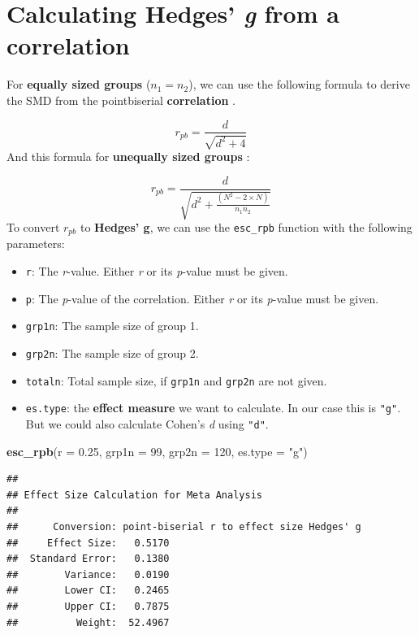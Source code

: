 \documentclass[]{book}
\newenvironment{Shaded}{\begin{snugshade}}{\end{snugshade}}
\newcommand{\DataTypeTok}[1]{\textcolor[rgb]{0.13,0.29,0.53}{#1}}
\newcommand{\DecValTok}[1]{\textcolor[rgb]{0.00,0.00,0.81}{#1}}
\newcommand{\FloatTok}[1]{\textcolor[rgb]{0.00,0.00,0.81}{#1}}
\newcommand{\KeywordTok}[1]{\textcolor[rgb]{0.13,0.29,0.53}{\textbf{#1}}}
\newcommand{\NormalTok}[1]{#1}
\newcommand{\StringTok}[1]{\textcolor[rgb]{0.31,0.60,0.02}{#1}}
\providecommand{\tightlist}{%
  \setlength{\itemsep}{0pt}\setlength{\parskip}{0pt}}
\begin{document}
\hypertarget{f}{%
\section{\texorpdfstring{Calculating Hedges' \emph{g} from a correlation}{Calculating Hedges' g from a correlation}}\label{f}}

For \textbf{equally sized groups} (\(n_1=n_2\)), we can use the following formula to derive the SMD from the pointbiserial \textbf{correlation} \citep{rosenthal1984meta}.

\[r_{pb} = \frac{d}{\sqrt{d^2+4}}\]
And this formula for \textbf{unequally sized groups} \citep{aaron1998equating}:

\[r_{pb} = \frac{d}{\sqrt{d^2+  \frac{(N^2-2 \times N)}{n_1 n_2} }}\]
To convert \(r_{pb}\) to \textbf{Hedges' g}, we can use the \texttt{esc\_rpb} function with the following parameters:

\begin{itemize}
\tightlist
\item
  \texttt{r}: The \emph{r}-value. Either \emph{r} or its \emph{p}-value must be given.
\item
  \texttt{p}: The \emph{p}-value of the correlation. Either \emph{r} or its \emph{p}-value must be given.
\item
  \texttt{grp1n}: The sample size of group 1.
\item
  \texttt{grp2n}: The sample size of group 2.
\item
  \texttt{totaln}: Total sample size, if \texttt{grp1n} and \texttt{grp2n} are not given.
\item
  \texttt{es.type}: the \textbf{effect measure} we want to calculate. In our case this is \texttt{"g"}. But we could also calculate Cohen's \emph{d} using \texttt{"d"}.
\end{itemize}

\begin{Shaded}
\begin{Highlighting}[]
\KeywordTok{esc_rpb}\NormalTok{(}\DataTypeTok{r =} \FloatTok{0.25}\NormalTok{, }\DataTypeTok{grp1n =} \DecValTok{99}\NormalTok{, }\DataTypeTok{grp2n =} \DecValTok{120}\NormalTok{, }\DataTypeTok{es.type =} \StringTok{"g"}\NormalTok{)}
\end{Highlighting}
\end{Shaded}

\begin{verbatim}
## 
## Effect Size Calculation for Meta Analysis
## 
##      Conversion: point-biserial r to effect size Hedges' g
##     Effect Size:   0.5170
##  Standard Error:   0.1380
##        Variance:   0.0190
##        Lower CI:   0.2465
##        Upper CI:   0.7875
##          Weight:  52.4967
\end{verbatim}
\end{document}
